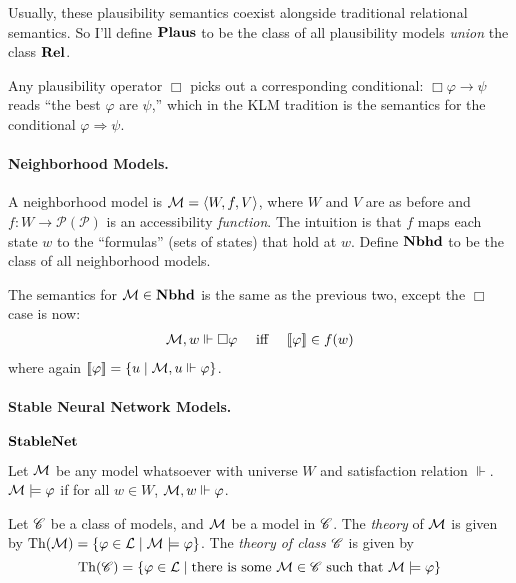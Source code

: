 \documentclass[letterpaper]{article}
\begin{document}
Usually, these plausibility semantics coexist alongside traditional relational semantics.  So I'll define $\textrm{\textbf{Plaus}}$ to be the class of all plausibility models \emph{union} the class $\textrm{\textbf{Rel}}$.

Any plausibility operator $\Box$ picks out a corresponding conditional: $\Box \varphi \to \psi$ reads ``the best $\varphi$ are $\psi$,'' which in the KLM tradition is the semantics for the conditional $\varphi \Rightarrow \psi$.

\paragraph*{Neighborhood Models.} A neighborhood model is $\mathcal{M} = \langle W, f, V \rangle$, where $W$ and $V$ are as before and $f : W \to \mathcal{P}(\mathcal{P})$ is an accessibility \emph{function}.  The intuition is that $f$ maps each state $w$ to the ``formulas'' (sets of states) that hold at $w$.  Define $\textrm{\textbf{Nbhd}}$ to be the class of all neighborhood models.

The semantics for $\mathcal{M} \in \textrm{\textbf{Nbhd}}$ is the same as the previous two, except the $\Box$ case is now:
\[
\begin{array}{lcl}
    \mathcal{M}, w \Vdash \Box \varphi & \mbox{ iff } & [\![\mbox{\em $ \varphi $\/}]\!] \in f(w)
\end{array}
\]
where again $[\![\mbox{\em $ \varphi $\/}]\!] = \{ u \mid \mathcal{M}, u \Vdash \varphi \}$.

\paragraph*{Stable Neural Network Models.} $\textrm{\textbf{StableNet}}$

\begin{definition}
    Let $\mathcal{M}$ be any model whatsoever with universe $W$ and satisfaction relation $\Vdash$.  $\mathcal{M} \models \varphi$ if for all $w \in W$, $\mathcal{M}, w \Vdash \varphi$.
\end{definition}

\begin{definition}
    Let $\mathscr{C}$ be a class of models, and $\mathcal{M}$ be a model in $\mathscr{C}$.  The \emph{theory} of $\mathcal{M}$ is given by $\mathrm{Th}( \mathcal{M} ) = \{ \varphi \in \mathcal{L} \mid \mathcal{M} \models \varphi \}$.  The \emph{theory of class $\mathscr{C}$} is given by 
    \[
        \mathrm{Th}( \mathscr{C} ) = \{ \varphi \in \mathcal{L} \mid \textrm{there is some } \mathcal{M} \in \mathscr{C} \textrm{ such that } \mathcal{M} \models \varphi \}
    \]
\end{definition}
\end{document}
